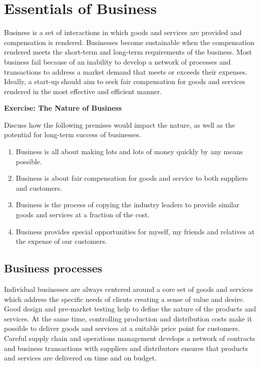 \documentclass[]{book}
\providecommand{\tightlist}{%
  \setlength{\itemsep}{0pt}\setlength{\parskip}{0pt}}
\let\BeginKnitrBlock\begin \let\EndKnitrBlock\end
\begin{document}
\hypertarget{essentials-of-business}{%
\section{Essentials of Business}\label{essentials-of-business}}

Business is a set of interactions in which goods and services are provided and compensation is rendered. Businesses become sustainable when the compensation rendered meets the short-term and long-term requirements of the business. Most business fail because of an inability to develop a network of processes and transactions to address a market demand that meets or exceeds their expenses. Ideally, a start-up should aim to seek fair compensation for goods and services rendered in the most effective and efficient manner.

\BeginKnitrBlock{rmdexercise}
\textbf{Exercise: The Nature of Business}

Discuss how the following premises would impact the nature, as well as the potential for long-term success of businesses.

\begin{enumerate}
\def\labelenumi{\arabic{enumi}.}
\tightlist
\item
  Business is all about making lots and lots of money quickly by any means possible.
\item
  Business is about fair compensation for goods and service to both suppliers and customers.
\item
  Business is the process of copying the industry leaders to provide similar goods and services at a fraction of the cost.
\item
  Business provides special opportunities for myself, my friends and relatives at the expense of our customers.
\end{enumerate}
\EndKnitrBlock{rmdexercise}

\hypertarget{business-processes}{%
\subsection{Business processes}\label{business-processes}}

Individual businesses are always centered around a core set of goods and services which address the specific needs of clients creating a sense of value and desire. Good design and pre-market testing help to define the nature of the products and services. At the same time, controlling production and distribution costs make it possible to deliver goods and services at a suitable price point for customers. Careful supply chain and operations management develops a network of contracts and business transactions with suppliers and distributors ensures that products and services are delivered on time and on budget.
\end{document}
